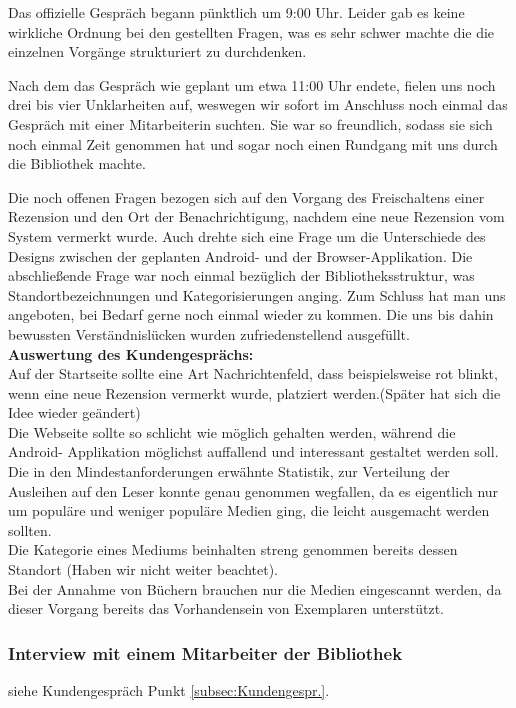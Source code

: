 \documentclass[fontsize=12pt,paper=a4,twoside]{scrartcl}
\begin{document}
Das offizielle Gespräch begann pünktlich um 9:00 Uhr. Leider gab es keine wirkliche Ordnung bei den gestellten Fragen, was es sehr schwer machte die die einzelnen Vorgänge strukturiert zu durchdenken.

Nach dem das Gespräch wie geplant um etwa 11:00 Uhr endete, fielen uns noch drei bis vier Unklarheiten auf, weswegen wir sofort im Anschluss noch einmal das Gespräch mit einer Mitarbeiterin suchten. Sie war so freundlich, sodass sie sich noch einmal Zeit genommen hat und sogar noch einen Rundgang mit uns durch die Bibliothek machte.

Die noch offenen Fragen bezogen sich auf den Vorgang des Freischaltens einer Rezension und den Ort der Benachrichtigung, nachdem eine neue Rezension vom System vermerkt wurde. Auch drehte sich eine Frage um die Unterschiede des Designs zwischen der geplanten Android- und der Browser-Applikation. Die abschließende Frage war noch einmal bezüglich der Bibliotheksstruktur, was Standortbezeichnungen und Kategorisierungen anging. Zum Schluss hat man uns angeboten, bei Bedarf gerne noch einmal wieder zu kommen. Die uns bis dahin bewussten Verständnislücken wurden zufriedenstellend ausgefüllt.\\

\textbf{Auswertung des Kundengesprächs:}\\
Auf der Startseite sollte eine Art Nachrichtenfeld, dass beispielsweise rot blinkt, wenn eine neue Rezension vermerkt wurde, platziert werden.(Später hat sich die Idee wieder geändert)\\
Die Webseite sollte so schlicht wie möglich gehalten werden, während die Android- Applikation möglichst auffallend und interessant gestaltet werden soll.\\
Die in den Mindestanforderungen erwähnte Statistik, zur Verteilung der Ausleihen auf den Leser konnte genau genommen wegfallen, da es eigentlich nur um populäre und weniger populäre Medien ging, die leicht ausgemacht werden sollten.\\
Die Kategorie eines Mediums beinhalten streng genommen bereits dessen Standort (Haben wir nicht weiter beachtet).\\
Bei der Annahme von Büchern brauchen nur die Medien eingescannt werden, da dieser Vorgang bereits das Vorhandensein von Exemplaren unterstützt.

\subsubsection{Interview mit einem Mitarbeiter der Bibliothek} \label{subsec:InterviewMitarbeiter} siehe Kundengespräch Punkt \ref{subsec:Kundengespr.}. 
\end{document}

